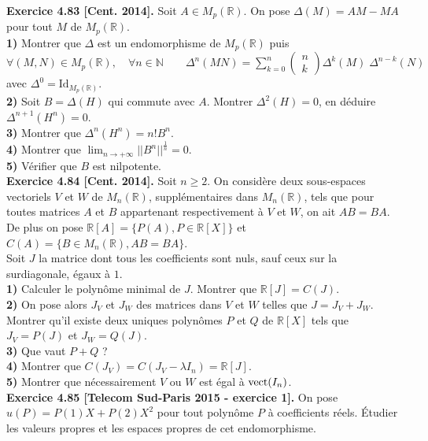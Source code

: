\documentclass[a4paper,12pt,francais]{article}
\newcommand{\field}[1]{\mathbb{#1}}
\newcommand{\N}{\field{N}}
\newcommand{\R}{\field{R}}
\newcommand{\id}{\mbox{Id}}
\begin{document}
\noindent
{\bf Exercice 4.83 [Cent. 2014].} 
Soit $A \in M_p(\R)$. On pose $ \Delta (M) = AM-MA$ pour tout $M$ de $M_p(\R)$.\\
{\bf 1)} Montrer que $\Delta $ est un endomorphisme de $M_p(\R)$ puis\\
\hspace{3cm} $\displaystyle  \forall (M,N) \in M_p(\R),\quad \forall n \in \N \qquad \Delta^n(MN)=\sum_{k=0}^{n} \begin{pmatrix} n\\k \end{pmatrix} \Delta^k(M)\; \Delta^{n-k}(N)$ avec $\Delta^0=\id_{M_p(\R)}$. \\
\noindent
{\bf 2)} Soit $B=\Delta(H)$ qui commute avec $A$. Montrer $\Delta^2(H)=0$, en déduire $\Delta^{n+1}(H^n)=0$.\\
{\bf 3)} Montrer que $\Delta^n(H^n)=n!B^n$.\\
{\bf 4)} Montrer que $\lim_{n\to + \infty} ||B^n||^{\frac{1}{n}} = 0$.\\
{\bf 5)} Vérifier que $B$ est nilpotente.\\

\noindent
{\bf Exercice 4.84 [Cent. 2014].} %
Soit $n \geqslant 2$. On considère deux sous-espaces vectoriels $V$ et $W$ de $M_n(\R)$, supplémentaires dans $M_n(\R)$, tels que pour toutes matrices $A$ et $B$ appartenant respectivement à $V$ et $W$, on ait $AB=BA$. De plus on pose $\R[A] = \{P(A), P \in \R[X]\}$ et $C(A)= \{B\in M_n(\R), AB=BA\}$.\\
Soit $J$ la matrice dont tous les coefficients sont nuls, sauf ceux sur la surdiagonale, égaux à $1$.\\
{\bf 1)} Calculer le polynôme minimal de $J$. Montrer que $\R[J]=C(J)$.\\
{\bf 2)} On pose alors $J_V$ et $J_W$ des matrices dans $V$ et $W$ telles que $J=J_V + J_W$. 
Montrer qu'il existe deux uniques polynômes $P$ et $Q$ de $\R[X]$ tels que $J_V=P(J)$ et $J_W=Q(J)$.\\
{\bf 3)} Que vaut $P+Q$ ?\\
{\bf 4)} Montrer que $C(J_V)=C(J_V-\lambda I_n)=\R[J]$.\\
{\bf 5)} Montrer que nécessairement $V$ ou $W$ est égal à ${\rm vect}(I_n)$.\\

\noindent
{\bf Exercice 4.85 [Telecom Sud-Paris 2015 - exercice 1].} On pose
$u (P) = P(1)X + P(2)X^2$ pour tout polynôme $P$ à coefficients réels. \'Etudier les valeurs propres et les espaces propres de cet endomorphisme.\\
 
\end{document}
